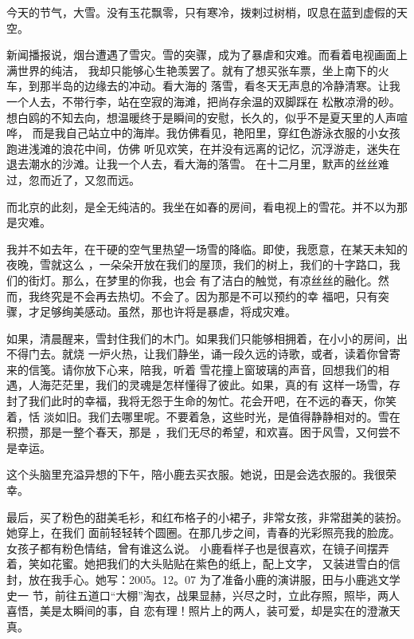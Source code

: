 \documentclass[12pt,a4paper]{article}
\begin{document}
	\endwriting



		今天的节气，大雪。没有玉花飘零，只有寒冷，拨剌过树梢，叹息在蓝到虚假的天空。


		新闻播报说，烟台遭遇了雪灾。雪的突骤，成为了暴虐和灾难。而看着电视画面上满世界的纯洁，
	我却只能够心生艳羡罢了。就有了想买张车票，坐上南下的火车，到那半岛的边缘去的冲动。看大海的
	落雪，看冬天无声息的冷静清寒。让我一个人去，不带行李，站在空寂的海滩，把尚存余温的双脚踩在
	松散凉滑的砂。想白鸥的不知去向，想温暖终于是瞬间的安慰，长久的，似乎不是夏天里的人声喧哗，
	而是我自己站立中的海岸。我仿佛看见，艳阳里，穿红色游泳衣服的小女孩跑进浅滩的浪花中间，仿佛
	听见欢笑，在并没有远离的记忆，沉浮游走，迷失在退去潮水的沙滩。让我一个人去，看大海的落雪。
	在十二月里，默声的丝丝难过，忽而近了，又忽而远。


		而北京的此刻，是全无纯洁的。我坐在如春的房间，看电视上的雪花。并不以为那是灾难。

		我并不如去年，在干硬的空气里热望一场雪的降临。即使，我愿意，在某天未知的夜晚，雪就这么
	，一朵朵开放在我们的屋顶，我们的树上，我们的十字路口，我们的街灯。那么，在梦里的你我，也会
	有了洁白的触觉，有凉丝丝的融化。然而，我终究是不会再去热切。不会了。因为那是不可以预约的幸
	福吧，只有突骤，才足够绚美感动。虽然，那也许将是暴虐，将成灾难。


		如果，清晨醒来，雪封住我们的木门。如果我们只能够相拥着，在小小的房间，出不得门去。就烧
	一炉火热，让我们静坐，诵一段久远的诗歌，或者，读着你曾寄来的信笺。请你放下心来，陪我，听着
	雪花撞上窗玻璃的声音，回想我们的相遇，人海茫茫里，我们的灵魂是怎样懂得了彼此。如果，真的有
	这样一场雪，存封了我们此时的幸福，我将无怨于生命的匆忙。花会开吧，在不远的春天，你笑着，恬
	淡如旧。我们去哪里呢。不要着急，这些时光，是值得静静相对的。雪在积攒，那是一整个春天，那是
	，我们无尽的希望，和欢喜。困于风雪，又何尝不是幸运。


		这个头脑里充溢异想的下午，陪小鹿去买衣服。她说，田是会选衣服的。我很荣幸。

		最后，买了粉色的甜美毛衫，和红布格子的小裙子，非常女孩，非常甜美的装扮。她穿上，在我们
	面前轻轻转个圆圈。在那几步之间，青春的光彩照亮我的脸庞。女孩子都有粉色情结，曾有谁这么说。
	小鹿看样子也是很喜欢，在镜子间摆弄着，笑如花蜜。她把我们的大头贴贴在紫色的纸上，配上文字，
	又装进雪白的信封，放在我手心。她写：2005。12。07 为了准备小鹿的演讲服，田与小鹿逃文学史一
	节，前往五道口“大棚”淘衣，战果显赫，兴尽之时，立此存照，照毕，两人喜悟，美是太瞬间的事，自
	恋有理！照片上的两人，装可爱，却是实在的澄澈天真。
\end{document}
